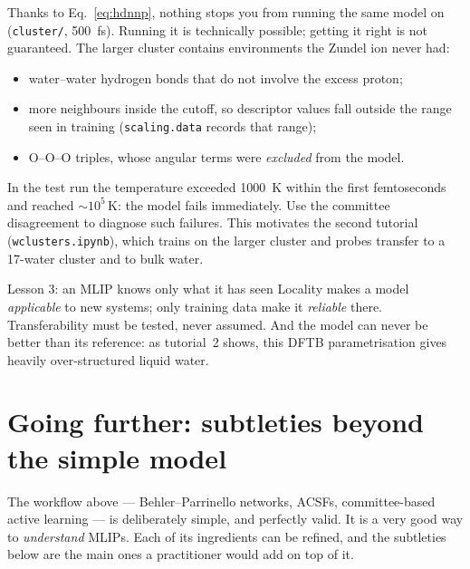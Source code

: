 \documentclass[11pt,a4paper]{article}
\begin{document}
Thanks to Eq.~\eqref{eq:hdnnp}, nothing stops you from running the same
model on  (\texttt{cluster/}, \SI{500}{fs}). Running it is
technically possible; getting it right is not guaranteed. The larger cluster
contains environments the Zundel ion never had:
\begin{itemize}[nosep]
  \item water--water hydrogen bonds that do not involve the excess proton;
  \item more neighbours inside the cutoff, so descriptor values fall
        outside the range seen in training (\texttt{scaling.data} records
        that range);
  \item O--O--O triples, whose angular terms were \emph{excluded} from the model.
\end{itemize}
In the test run the temperature exceeded \SI{1000}{K} within the first
femtoseconds and reached $\sim\!10^5\,$K: the model fails immediately. Use
the committee disagreement to diagnose such failures. This motivates the second tutorial (\texttt{wclusters.ipynb}), which
trains on the larger cluster and probes transfer to a 17-water cluster and to
bulk water.

\begin{keybox}{Lesson 3: an MLIP knows only what it has seen}
Locality makes a model \emph{applicable} to new systems; only training data
make it \emph{reliable} there. Transferability must be tested, never assumed.
And the model can never be better than its reference: as tutorial~2 shows,
this DFTB parametrisation gives heavily over-structured liquid water.
\end{keybox}

\section{Going further: subtleties beyond the simple model}
\label{sec:novelty}

The workflow above --- Behler--Parrinello networks, ACSFs, committee-based
active learning --- is deliberately simple, and perfectly valid. It is a
very good way to \emph{understand} MLIPs. Each of its ingredients can be
refined, and the subtleties below are the main ones a practitioner would add
on top of it.
\end{document}
